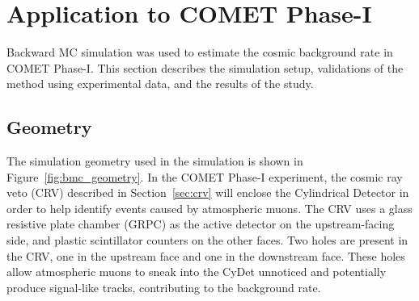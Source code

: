 \section{Application to COMET Phase-I}
Backward MC simulation was used to estimate the cosmic background rate in COMET
Phase-I. This section describes the simulation setup, validations of the method
using experimental data, and the results of the study.

\subsection{Geometry}
The simulation geometry used in the simulation is shown in
Figure~\ref{fig:bmc_geometry}. In the COMET \mbox{Phase-I} experiment, the cosmic ray
veto (CRV) described in Section~\ref{sec:crv} will enclose the Cylindrical
Detector in order to help identify events caused by atmospheric muons. The CRV
uses a glass resistive plate chamber (GRPC) as the active detector on the
upstream-facing side, and plastic scintillator counters on the other faces. Two
holes are present in the CRV, one in the upstream face and one in the downstream
face. These holes allow atmospheric muons to sneak into the CyDet unnoticed and
potentially produce signal-like tracks, contributing to the background rate.



